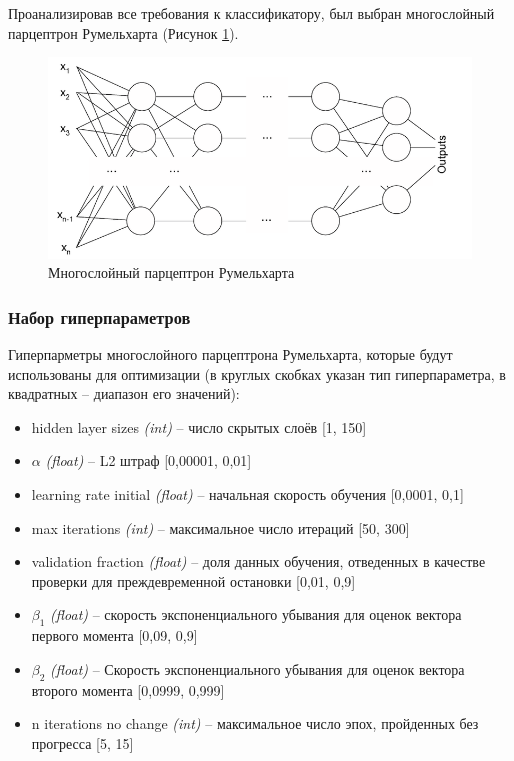 \documentclass[times,specification,annotation]{itmo-student-thesis}
\begin{document}
		Проанализировав все требования к классификатору, был выбран многослойный парцептрон Румельхарта\cite{article, hastie_09_elements-of.statistical-learning} (Рисунок \ref{img:parceptron}).
		\begin{figure}[!ht]
			\caption{Многослойный парцептрон Румельхарта\cite{hastie_09_elements-of.statistical-learning}}\label{img:parceptron}
			\includegraphics[width=0.85\linewidth]{parceptrone}
			\centering
		\end{figure}
		\subsubsection{Набор гиперпараметров}
		Гиперпарметры многослойного парцептрона Румельхарта, которые будут использованы для оптимизации (в круглых скобках указан тип гиперпараметра, в квадратных -- диапазон его значений):
		\begin{itemize}
			\item hidden layer sizes \textit{(int)} -- число скрытых слоёв [1, 150]
			\item $ \alpha $ \textit{(float)} -- L2 штраф [0,00001, 0,01]
			\item learning rate initial \textit{(float)} -- начальная скорость обучения [0,0001, 0,1]
			\item max iterations \textit{(int)} -- максимальное число итераций [50, 300]
			\item validation fraction \textit{(float)} -- доля данных обучения, отведенных в качестве проверки для преждевременной остановки [0,01, 0,9]
			\item $ \beta_{1} $ \textit{(float)} -- скорость экспоненциального убывания для оценок вектора первого момента [0,09, 0,9]
			\item $ \beta_{2} $ \textit{(float)} -- Скорость экспоненциального убывания для оценок вектора второго момента [0,0999, 0,999]
			\item n iterations no change \textit{(int)} -- максимальное число эпох, пройденных без прогресса [5, 15]
		\end{itemize}
		
\end{document}
